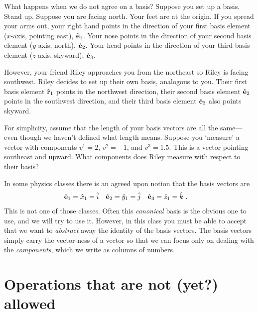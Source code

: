 \documentclass[12pt, oneside]{report}    %
\let\oldsection\section
\def\section{%
  \setcounter{sidenote}{1}%
  \oldsection
}
\begin{document}
\begin{exercise}
What happens when we do not agree on a basis? Suppose you set up a basis. Stand up. Suppose you are facing north. Your feet are at the origin. If you spread your arms out, your right hand points in the direction of your first basis element ($x$-axis, pointing east), ${\hat{\mathbf{e}}}_1$. Your nose points in the direction of your second basis element ($y$-axis, north), ${\hat{\mathbf{e}}}_2$. Your head points in the direction of your third basis element ($z$-axis, skyward), ${\hat{\mathbf{e}}}_3$.

However, your friend Riley approaches you from the northeast so Riley is facing southwest. Riley decides to set up their own basis, analogous to you. Their first basis element ${\hat{\mathbf{r}}}_1$ points in the northwest direction, their second basis element ${\hat{\mathbf{e}}}_2$ points in the southwest direction, and their third basis element ${\hat{\mathbf{e}}}_3$ also points skyward. 

For simplicity, assume that the length of your basis vectors are all the same---even though we haven't defined what length means. Suppose you `measure' a vector with components $v^1 = 2$, $v^2=-1$, and $v^3=1.5$. This is a vector pointing southeast and upward. What components does Riley measure with respect to their basis?
\end{exercise}



In some physics classes there is an agreed upon notion that the basis vectors are 
\begin{align}
    \hat{\mathbf{e}}_1 &= \hat x_1 = \hat i
    &
    \hat{\mathbf{e}}_2 &= \hat y_1 = \hat j
    &
    \hat{\mathbf{e}}_3 &= \hat z_1 = \hat k \ .
\end{align}
This is not one of those classes. Often this \emph{canonical} basis is the obvious one to use, and we will try to use it. However, in this class you must be able to accept that we want to \emph{abstract} away the identity of the basis vectors. The basis vectors simply carry the vector-ness of a vector so that we can focus only on dealing with the \emph{components}, which we write as columns of numbers.




\section{Operations that are not (yet?) allowed}
\end{document}
